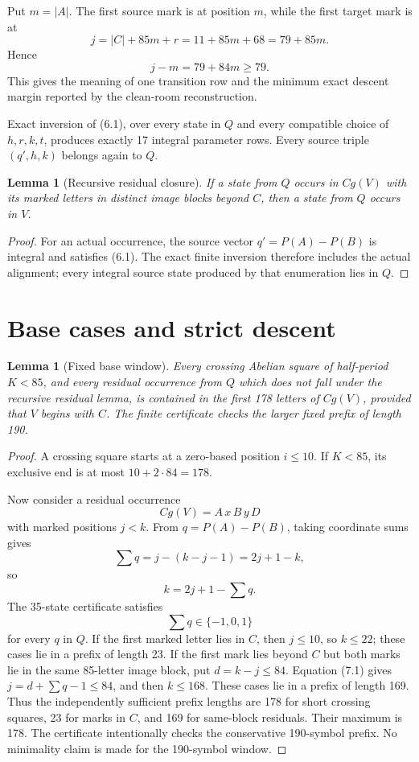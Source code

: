 \documentclass[11pt]{article}
\newtheorem{lemma}[theorem]{Lemma}
\theoremstyle{definition}
\newcommand{\Par}{P}
\begin{document}
Put $m=|A|$. The first source mark is at position $m$, while the first target mark is at
\[
j=|C|+85m+r=11+85m+68=79+85m.
\]
Hence
\[
j-m=79+84m\ge79.
\tag{6.2}
\]
This gives the meaning of one transition row and the minimum exact descent margin reported by the clean-room reconstruction.

Exact inversion of (6.1), over every state in $Q$ and every compatible choice of $h,r,k,t$, produces exactly 17 integral parameter rows. Every source triple $(q',h,k)$ belongs again to $Q$.

\begin{lemma}[Recursive residual closure]
If a state from $Q$ occurs in $Cg(V)$ with its marked letters in distinct image blocks beyond $C$, then a state from $Q$ occurs in $V$.
\end{lemma}

\begin{proof}
For an actual occurrence, the source vector $q'=\Par(A)-\Par(B)$ is integral and satisfies (6.1). The exact finite inversion therefore includes the actual alignment; every integral source state produced by that enumeration lies in $Q$.
\end{proof}

\section{Base cases and strict descent}

\begin{lemma}[Fixed base window]
Every crossing Abelian square of half-period $K<85$, and every residual occurrence from $Q$ which does not fall under the recursive residual lemma, is contained in the first 178 letters of $Cg(V)$, provided that $V$ begins with $C$. The finite certificate checks the larger fixed prefix of length 190.
\end{lemma}

\begin{proof}
A crossing square starts at a zero-based position $i\le10$. If $K<85$, its exclusive end is at most $10+2\cdot84=178$.

Now consider a residual occurrence
\[
Cg(V)=A\,x\,B\,y\,D
\]
with marked positions $j<k$. From $q=\Par(A)-\Par(B)$, taking coordinate sums gives
\[
\sum q=j-(k-j-1)=2j+1-k,
\]
so
\[
k=2j+1-\sum q.
\tag{7.1}
\]
The 35-state certificate satisfies
\[
\sum q\in\{-1,0,1\}
\tag{7.2}
\]
for every $q$ in $Q$. If the first marked letter lies in $C$, then $j\le10$, so $k\le22$; these cases lie in a prefix of length 23. If the first mark lies beyond $C$ but both marks lie in the same 85-letter image block, put $d=k-j\le84$. Equation (7.1) gives $j=d+\sum q-1\le84$, and then $k\le168$. These cases lie in a prefix of length 169. Thus the independently sufficient prefix lengths are 178 for short crossing squares, 23 for marks in $C$, and 169 for same-block residuals. Their maximum is 178. The certificate intentionally checks the conservative 190-symbol prefix. No minimality claim is made for the 190-symbol window.
\end{proof}
\end{document}

